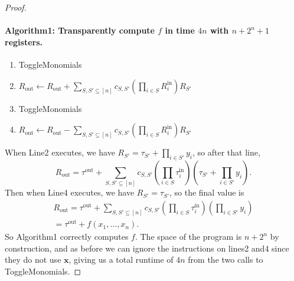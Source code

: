 \documentclass[10pt,a4paper]{article}
\begin{document}
\begin{proof}
\paragraph{Algorithm1: Transparently compute $f$ in time $4n$ with $n+2^n+1$ registers.}
\begin{enumerate}[label=\arabic*:]
\item ToggleMonomials
\item $R_{\mathrm{out}}\leftarrow R_{\mathrm{out}}+\sum_{S,S'\subseteq[n]}c_{S,S'}(\prod_{i\in S}R_i^{\mathrm{in}})R_{S'}$
\item ToggleMonomials
\item $R_{\mathrm{out}}\leftarrow R_{\mathrm{out}}-\sum_{S,S'\subseteq[n]}c_{S,S'}(\prod_{i\in S}R_i^{\mathrm{in}})R_{S'}$
\end{enumerate}
When Line2 executes, we have $R_{S'}=\tau_{S'}+\prod_{i\in S'}y_i$, so after that line,
\[R_{\mathrm{out}}=\tau^{\mathrm{out}}+\sum_{S,S'\subseteq[n]}c_{S,S'}\left(\prod_{i\in S}\tau_i^{\mathrm{in}}\right)\left(\tau_{S'}+\prod_{i\in S'}y_i\right).\]
Then when Line4 executes, we have $R_{S'}=\tau_{S'}$, so the final value is
\begin{multline*}
R_{\mathrm{out}}=\tau^{\mathrm{out}}+\sum_{S,S'\subseteq[n]}c_{S,S'}\left(\prod_{i\in S}\tau_i^{\mathrm{in}}\right)\left(\prod_{i\in S'}y_i\right)\\
=\tau^{\mathrm{out}}+f(x_1,\ldots,x_n).
\end{multline*}
So Algorithm1 correctly computes $f$. The space of the program is $n+2^n$ by construction, and as before we can ignore the instructions on lines2 and4 since they do not use $\mathbf x$, giving us a total runtime of $4n$ from the two calls to ToggleMonomials.
\end{proof}
\end{document}
